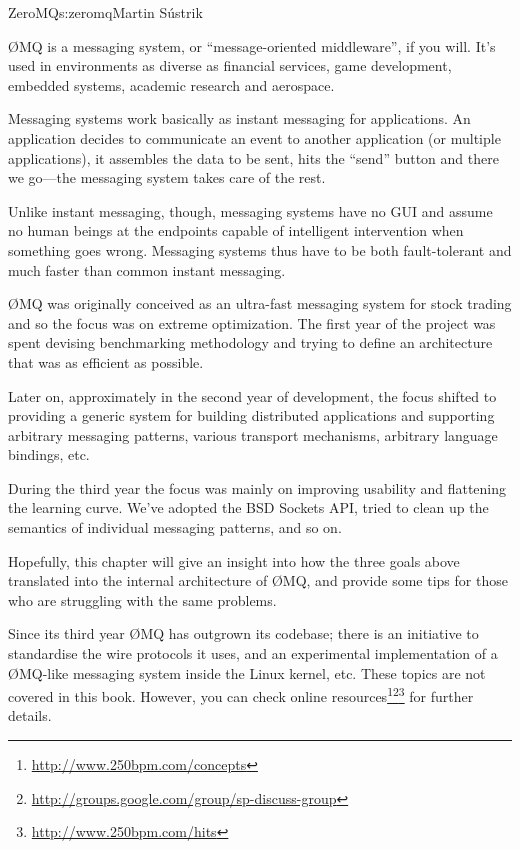 \begin{aosachapter}{ZeroMQ}{s:zeromq}{Martin S\'{u}strik}

{\O}MQ is a messaging system, or ``message-oriented middleware'', if you
will. It's used in environments as diverse as financial services, game
development, embedded systems, academic research and aerospace.

Messaging systems work basically as instant messaging for
applications. An application decides to communicate an event to
another application (or multiple applications), it assembles the data
to be sent, hits the ``send'' button and there we go---the messaging
system takes care of the rest.

Unlike instant messaging, though, messaging systems have no GUI and
assume no human beings at the endpoints capable of intelligent
intervention when something goes wrong. Messaging systems thus have to
be both fault-tolerant and much faster than common instant messaging.

{\O}MQ was originally conceived as an ultra-fast messaging system
for stock trading and so the focus was on extreme optimization. The
first year of the project was spent devising benchmarking methodology
and trying to define an architecture that was as efficient as possible.

Later on, approximately in the second year of development, the focus
shifted to providing a generic system for building distributed
applications and supporting arbitrary messaging patterns, various
transport mechanisms, arbitrary language bindings, etc.

During the third year the focus was mainly on improving usability and 
flattening the learning curve. We've adopted the BSD Sockets API, tried to
clean up the semantics of individual messaging patterns, and so on.

Hopefully, this chapter will give an insight into how the three goals
above translated into the internal architecture of {\O}MQ, and provide
some tips for those who are struggling with the same problems.

Since its third year {\O}MQ has outgrown its codebase; there is
an initiative to standardise the wire protocols it uses, and an
experimental implementation of a {\O}MQ-like messaging system inside the Linux
kernel, etc.  These topics are not covered in this book. However, you can check
online
resources\footnote{\url{http://www.250bpm.com/concepts}}\footnote{\url{http://groups.google.com/group/sp-discuss-group}}\footnote{\url{http://www.250bpm.com/hits}}
for further details.


\end{aosachapter}

